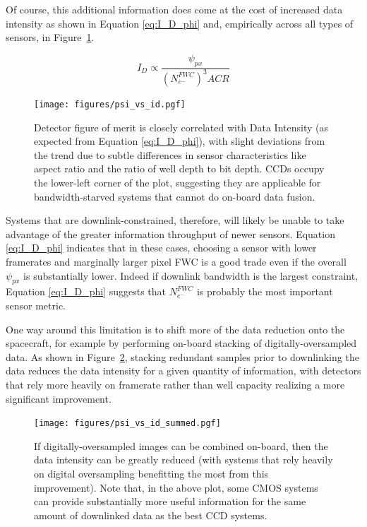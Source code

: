 \documentclass[]{spieman}  %
\begin{document}
Of course, this additional information does come at the cost of increased data intensity as shown in Equation \eqref{eq:I_D_phi} and, empirically across all types of sensors, in Figure~\ref{fig:psi_vs_id}.

\begin{equation}
\label{eq:I_D_phi}
    I_D \propto \frac{\psi_{px}}{\left(N_{e^-}^{FWC}\right)^3 ACR}
\end{equation}

\begin{figure}
  \centering
  \texttt{[image: figures/psi\_vs\_id.pgf]}
  \caption{Detector figure of merit is closely correlated with Data Intensity (as expected from Equation \eqref{eq:I_D_phi}), with slight deviations from the trend due to subtle differences in sensor characteristics like aspect ratio and the ratio of well depth to bit depth. CCDs occupy the lower-left corner of the plot, suggesting they are applicable for bandwidth-starved systems that cannot do on-board data fusion.
  \label{fig:psi_vs_id}}
\end{figure}

Systems that are downlink-constrained, therefore, will likely be unable to take advantage of the greater information throughput of newer sensors. Equation \eqref{eq:I_D_phi}  indicates that in these cases, choosing a sensor with lower framerates and marginally larger pixel FWC is a good trade even if the overall $\psi_{px}$ is substantially lower.  Indeed if downlink bandwidth is the largest constraint, Equation \eqref{eq:I_D_phi} suggests that $N_{e^-}^{FWC}$ is probably the most important sensor metric.

One way around this limitation is to shift more of the data reduction onto the spacecraft, for example by performing on-board stacking of digitally-oversampled data. As shown in Figure~\ref{fig:psi_vs_id_summed}, stacking redundant samples prior to downlinking the data reduces the data intensity for a given quantity of information, with detectors that rely more heavily on framerate rather than well capacity realizing a more significant improvement.

\begin{figure}
  \centering
  \texttt{[image: figures/psi\_vs\_id\_summed.pgf]}
  \caption{If digitally-oversampled images can be combined on-board, then the data intensity can be greatly reduced (with systems that rely heavily on digital oversampling benefitting the most from this improvement). Note that, in the above plot, some CMOS systems can provide substantially more useful information for the same amount of downlinked data as the best CCD systems.
  \label{fig:psi_vs_id_summed}}
\end{figure}
\end{document}
